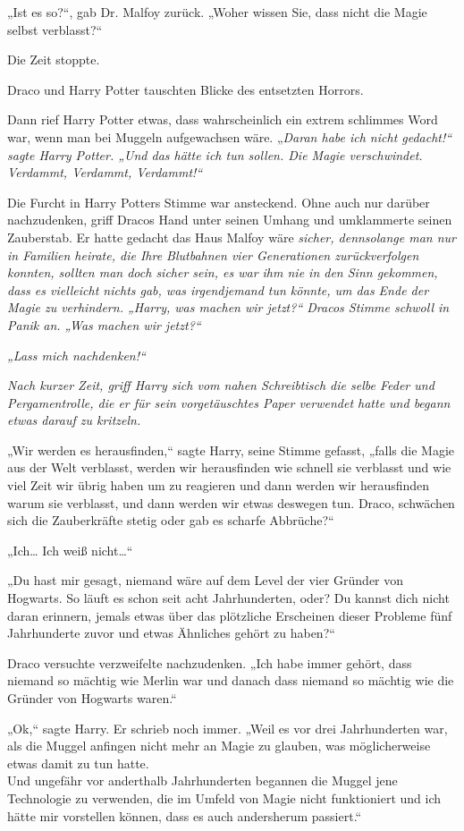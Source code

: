 {„Ist es so?“, gab Dr. Malfoy zurück. „Woher wissen Sie, dass nicht die Magie selbst verblasst?“

Die Zeit stoppte.

Draco und Harry Potter tauschten Blicke des entsetzten Horrors.

Dann rief Harry Potter etwas, dass wahrscheinlich ein extrem schlimmes Word war, wenn man bei Muggeln aufgewachsen wäre. „\emph{Daran habe ich nicht gedacht!“ sagte Harry Potter. „Und das hätte ich tun sollen. Die Magie verschwindet. Verdammt, Verdammt, Verdammt!“}

Die Furcht in Harry Potters Stimme war ansteckend. Ohne auch nur darüber nachzudenken, griff Dracos Hand unter seinen Umhang und umklammerte seinen Zauberstab. Er hatte gedacht das Haus Malfoy wäre \emph{sicher, dennsolange man nur in Familien heirate, die Ihre Blutbahnen vier Generationen zurückverfolgen konnten, sollten man doch \emph{sicher} sein, es war ihm nie in den Sinn gekommen, dass es vielleicht nichts gab, was irgendjemand tun könnte, um das Ende der Magie zu verhindern. „Harry, was machen wir jetzt?“ Dracos Stimme schwoll in Panik an. \emph{„Was machen wir jetzt?“}}

\emph{„Lass mich nachdenken!“}

\emph{Nach kurzer Zeit, griff Harry sich vom nahen Schreibtisch die selbe Feder und Pergamentrolle, die er für sein vorgetäuschtes Paper verwendet hatte und begann etwas darauf zu kritzeln.}

„Wir werden es herausfinden,“ sagte Harry, seine Stimme gefasst, „falls die Magie aus der Welt verblasst, werden wir herausfinden wie schnell sie verblasst und wie viel Zeit wir übrig haben um zu reagieren und dann werden wir herausfinden warum sie verblasst, und dann werden wir etwas deswegen tun. Draco, schwächen sich die Zauberkräfte stetig oder gab es scharfe Abbrüche?“

„Ich… Ich weiß nicht…“

„Du hast mir gesagt, niemand wäre auf dem Level der vier Gründer von Hogwarts. So läuft es schon seit acht Jahrhunderten, oder? Du kannst dich nicht daran erinnern, jemals etwas über das plötzliche Erscheinen dieser Probleme fünf Jahrhunderte zuvor und etwas Ähnliches gehört zu haben?“

Draco versuchte verzweifelte nachzudenken. „Ich habe immer gehört, dass niemand so mächtig wie Merlin war und danach dass niemand so mächtig wie die Gründer von Hogwarts waren.“

„Ok,“ sagte Harry. Er schrieb noch immer. „Weil es vor drei Jahrhunderten war, als die Muggel anfingen nicht mehr an Magie zu glauben, was möglicherweise etwas damit zu tun hatte.\\ Und ungefähr vor anderthalb Jahrhunderten begannen die Muggel jene Technologie zu verwenden, die im Umfeld von Magie nicht funktioniert und ich hätte mir vorstellen können, dass es auch andersherum passiert.“

}
